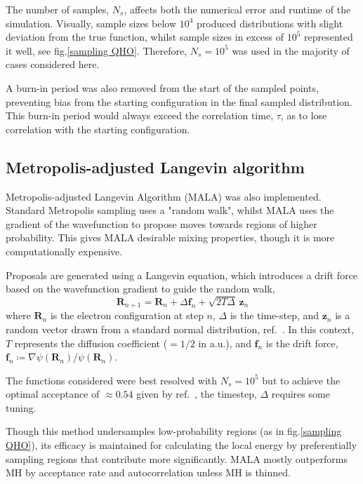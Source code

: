 \documentclass[journal,12pt]{Imperial_lab_report}
\begin{document}
        The number of samples, $N_s$, affects both the numerical error and runtime of the simulation. Visually, sample sizes below $10^4$ produced distributions with slight deviation from the true function, whilst sample sizes in excess of $10^5$ represented it well, see fig.\ref{sampling QHO}. Therefore, $N_s = 10^5$ was used in the majority of cases considered here. 

        A burn-in period was also removed from the start of the sampled points, preventing bias from the starting configuration in the final sampled distribution. This burn-in period would always exceed the correlation time, $\tau$, as to lose correlation with the starting configuration.

    \subsection{Metropolis-adjusted Langevin algorithm}
        Metropolis-adjusted Langevin Algorithm (MALA) was also implemented. Standard Metropolis sampling uses a "random walk", whilst MALA uses the gradient of the wavefunction to propose moves towards regions of higher probability. This gives MALA desirable mixing properties, though it is more computationally expensive.

        Proposals are generated using a Langevin equation, which introduces a drift force based on the wavefunction gradient to guide the random walk,
        \begin{equation}
            \mathbf{R}_{n+1} = \mathbf{R}_n + \Delta \mathbf{f}_n + \sqrt{2T\Delta}\,\mathbf{z}_n
        \end{equation} 
        \noindent where $\mathbf{R}_n$ is the electron configuration at step $n$, $\Delta$ is the time-step, and $\mathbf{z}_n$ is a random vector drawn from a standard normal distribution, ref.~\cite{becca_2017_quantum}. In this context, $T$ represents the diffusion coefficient ($=1/2$ in a.u.), and $\mathbf{f}_n$ is the drift force, $\mathbf{f}_n \coloneq {\nabla \psi(\mathbf{R}_n)}/{\psi(\mathbf{R}_n)}$.
        
        The functions considered were best resolved with $N_s = 10^5$ but to achieve the optimal acceptance of $\approx 0.54$ given by ref.~\cite{roberts_1998_optimal}, the timestep, $\Delta$ requires some tuning.

        Though this method undersamples low-probability regions (as in fig.\ref{sampling QHO}), its efficacy is maintained for calculating the local energy by preferentially sampling regions that contribute more significantly. MALA mostly outperforms MH by acceptance rate and autocorrelation unless MH is thinned.
\end{document}
